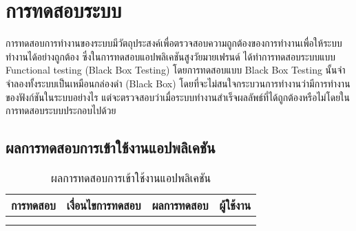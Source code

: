 \chapter{การทดสอบระบบ}
การทดสอบการทำงานของระบบมีวัตถุประสงค์เพื่อตรวจสอบความถูกต้องของการทำงานเพื่อให้ระบบทำงานได้อย่างถูกต้อง ซึ่งในการทดสอบแอปพลิเคชันสูงวัยมายเฟรนด์ ได้ทำการทดสอบระบบแบบ Functional testing (Black Box Testing) โดยการทดสอบแบบ Black Box Testing นั้นจำจำลองทั้งระบบเป็นเหมือนกล่องดำ (Black Box)  โดยที่จะไม่สนใจกระบวนการทำงานว่ามีการทำงานของฟังก์ชันในระบบอย่างไร แต่จะตรวจสอบว่าเมื่อระบบทำงานสำเร็จผลลัพธ์ที่ได้ถูกต้องหรือไม่โดยในการทดสอบระบบประกอบไปด้วย

\section{ผลการทดสอบการเข้าใช้งานแอปพลิเคชัน}
\begin{table}[H]
	\caption{ผลการทดสอบการเข้าใช้งานแอปพลิเคชัน}
    \centering	
	\label{tab:test1}
    \begin{tabular}{ | p{4cm} | p{4cm} | p{4cm} | p{2cm} | }
    \hline
	\multicolumn{1}{|c|}{การทดสอบ} & \multicolumn{1}{c|}{เงื่อนไขการทดสอบ} & \multicolumn{1}{c|}{ผลการทดสอบ} & \multicolumn{1}{c|}{ผู้ใช้งาน}                             \\ \hline
	\setstretch{1.0}{ทดสอบการเข้าใช้งานแอปพลิเคชัน}
	& \setstretch{1.0}{ผู้ใช้งานเข้าใช้งานแอปพลิเคชัน และยังไม่ออกจากระบบ}
	& \setstretch{1.0}{ระบบจะเข้าไปหน้าหลัก} 
	&\setstretch{1.0}{\begin{flushleft}ผู้ใช้งาน\end{flushleft}} \\ \cline{2-3} 
	& \setstretch{1.0}{ผู้ใช้งานเข้าใช้งานแอปพลิเคชัน และออกจากระบบ} 
	& \setstretch{1.0}{ระบบจะเข้าไปหน้าเข้าสู่ระบบ} 
	&\setstretch{1.0}{}\\ \cline{2-3} 
    \end{tabular}
\end{table}

